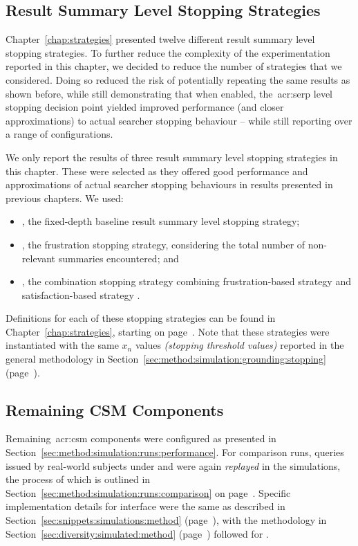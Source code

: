 \subsection{Result Summary Level Stopping Strategies}\label{sec:serp:method:snippet}
Chapter~\ref{chap:strategies} presented twelve different result summary level stopping strategies. To further reduce the complexity of the experimentation reported in this chapter, we decided to reduce the number of strategies that we considered. Doing so reduced the risk of potentially repeating the same results as shown before, while still demonstrating that when enabled, the~\gls{acr:serp} level stopping decision point yielded improved performance (and closer approximations) to actual searcher stopping behaviour -- while still reporting over a range of configurations.

We only report the results of three result summary level stopping strategies in this chapter. These were selected as they offered good performance and approximations of actual searcher stopping behaviours in results presented in previous chapters. We used:

\begin{itemize}
    \item{, the fixed-depth baseline result summary level stopping strategy;}
    \item{, the frustration stopping strategy, considering the total number of non-relevant summaries encountered; and}
    \item{, the combination stopping strategy combining frustration-based strategy  and satisfaction-based strategy .}
\end{itemize}

Definitions for each of these stopping strategies can be found in Chapter~\ref{chap:strategies}, starting on page~\pageref{chap:strategies}. Note that these strategies were instantiated with the same $x_n$ values \emph{(stopping threshold values)} reported in the general methodology in Section~\ref{sec:method:simulation:grounding:stopping} (page~\pageref{sec:method:simulation:grounding:stopping}).

\subsection{Remaining CSM Components}\label{sec:serp:method:other}
Remaining~\gls{acr:csm} components were configured as presented in Section~\ref{sec:method:simulation:runs:performance}. For comparison runs, queries issued by real-world subjects under  and  were again \emph{replayed} in the simulations, the process of which is outlined in Section~\ref{sec:method:simulation:runs:comparison} on page~\pageref{sec:method:simulation:runs:comparison}. Specific implementation details for interface  were the same as described in Section~\ref{sec:snippets:simulations:method} (page~\pageref{sec:snippets:simulations:method}), with the methodology in Section~\ref{sec:diversity:simulated:method} (page~\pageref{sec:diversity:simulated:method}) followed for .

